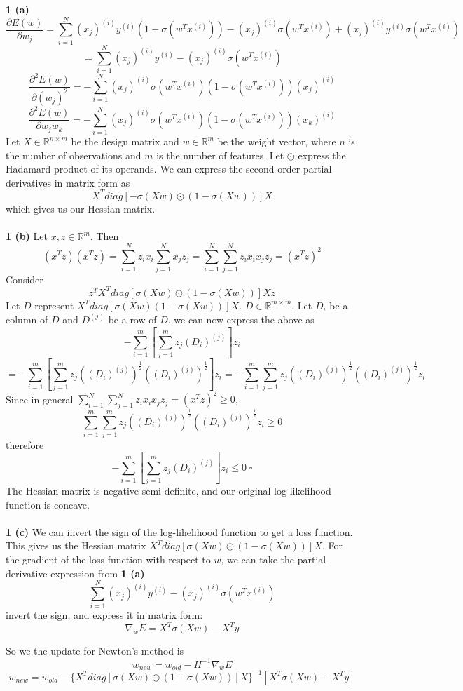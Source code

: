 \documentclass[12 pt]{article}        	%
\begin{document}
\textbf{1 (a)} 
\[
  \frac{\partial{E(w)}}{\partial w_j} = 
  \sum_{i=1}^{N} (x_j)^{(i)} y^{(i)} (1 - \sigma(w^T x^{(i)}))
  - (x_j)^{(i)} \sigma(w^T x^{(i)}) 
  + (x_j)^{(i)} y^{(i)} \sigma(w^T x^{(i)})
\]
\[
  = \sum_{i=1}^{N} (x_j)^{(i)} y^{(i)} 
  - (x_j)^{(i)} \sigma(w^T x^{(i)}) 
\]
\[
  \frac{\partial^2 E(w)}{\partial (w_j)^2}
  = - \sum_{i=1}^{N} (x_j)^{(i)} \sigma(w^T x^{(i)}) (1 - \sigma(w^T x^{(i)})) (x_j)^{(i)}
\]
\[
  \frac{\partial^2 E(w)}{\partial w_j w_k}
  = - \sum_{i=1}^{N} (x_j)^{(i)} \sigma(w^T x^{(i)}) (1 - \sigma(w^T x^{(i)})) (x_k)^{(i)}
\]
Let $ X \in \mathbb{R}^{n \times m} $ be the design matrix 
and $ w \in \mathbb{R}^m $ be the weight vector, 
where $ n $ is the number of observations
and $ m $ is the number of features. 
Let $ \odot $ express the Hadamard product of its operands. 
We can express the second-order partial derivatives in matrix form as 
\[
  X^T diag[ - \sigma(Xw) \odot (1 - \sigma(Xw)) ] X
\]
which gives us our Hessian matrix. \\ \\

\textbf{1 (b)} Let $ x, z \in \mathbb{R}^m $. Then
\[
  (x^T z)(x^T z) = 
  \sum_{i = 1}^{N} z_i x_i \sum_{j=1}^{N}x_j z_j
  = \sum_{i = 1}^{N} \sum_{j=1}^{N} z_i x_i x_j z_j
  = (x^T z)^2
\]
Consider
\[
  z^T X^T diag[ \sigma(Xw) \odot (1 - \sigma(Xw)) ] X z
\]
Let $ D $ represent $ X^T diag[ \sigma(Xw) (1 - \sigma(Xw)) ] X $. $ D \in \mathbb{R}^{ m \times m }$. 
Let $ D_i $ be a column of $ D $ and $ D^{(j)} $ be a row of $ D $.
we can now express the above as 
\[
  - \sum_{i=1}^{m} [ \sum_{j=1}^{m} z_j (D_i)^{(j)} ] z_i
\]
\[
  = - \sum_{i=1}^{m} [ \sum_{j=1}^{m} z_j ((D_i)^{(j)})^{\frac{1}{2}} ((D_i)^{(j)})^{\frac{1}{2}} ] z_i
  = - \sum_{i=1}^{m} \sum_{j=1}^{m} z_j ((D_i)^{(j)})^{\frac{1}{2}} ((D_i)^{(j)})^{\frac{1}{2}} z_i
\]
Since in general $ \sum_{i = 1}^{N} \sum_{j=1}^{N} z_i x_i x_j z_j  = (x^T z)^2 \ge 0 $, 
\[
  \sum_{i=1}^{m} \sum_{j=1}^{m} z_j ((D_i)^{(j)})^{\frac{1}{2}} ((D_i)^{(j)})^{\frac{1}{2}} z_i \ge 0
\]
therefore 
\[
  - \sum_{i=1}^{m} [ \sum_{j=1}^{m} z_j (D_i)^{(j)} ] z_i \le 0 \; \square
\]
The Hessian matrix is negative semi-definite, and our original log-likelihood function is concave. \\ \\

\textbf{1 (c)} We can invert the sign of the log-lihelihood function to get a loss function. This gives us the Hessian matrix 
$ X^T diag[ \sigma(Xw) \odot (1 - \sigma(Xw)) ] X $. For the gradient of the loss function with respect to $ w $, 
we can take the partial derivative expression from \textbf{1 (a)}
\[
  \sum_{i=1}^{N} (x_j)^{(i)} y^{(i)} 
  - (x_j)^{(i)} \sigma(w^T x^{(i)})
\]
invert the sign, and express it in matrix form:
\[
  \nabla_w E = X^T \sigma(Xw) - X^T y
\]

So we the update for Newton's method is
\[
  w_{new} = w_{old} - H^{-1} \nabla_w E 
\]
\[
  w_{new} = w_{old} - \{X^T diag[ \sigma(Xw) \odot (1 - \sigma(Xw)) ] X \}^{-1} [ X^T \sigma(Xw) - X^T y ]
\]
\end{document}
